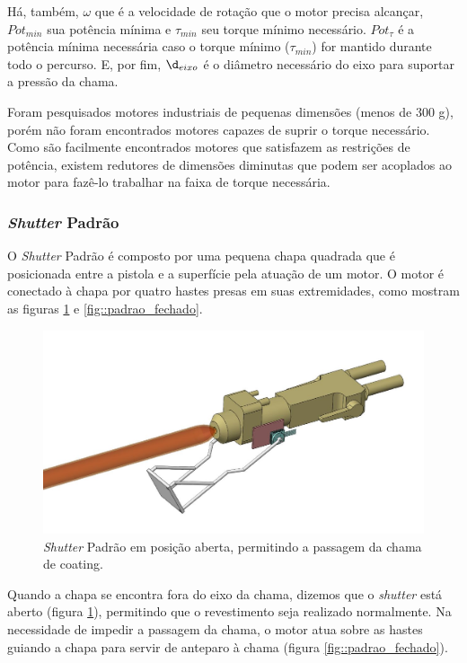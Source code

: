 Há, também, $\omega$ que é a velocidade de rotação que o motor precisa alcançar,
$Pot_{min}$ sua potência mínima e $\tau_{min}$ seu torque mínimo necessário.
$Pot_{\tau}$ é a potência mínima necessária caso o torque mínimo ($\tau_{min}$)
for mantido durante todo o percurso. E, por fim, $\d_{eixo}$ é o diâmetro necessário do eixo para suportar a
pressão da chama.

Foram pesquisados motores industriais de pequenas dimensões (menos de 300 g),
porém não foram encontrados motores capazes de suprir o torque necessário. Como
são facilmente encontrados motores que satisfazem as restrições de potência,
existem redutores de dimensões diminutas que podem ser acoplados ao motor para
fazê-lo trabalhar na faixa de torque necessária.


\subsubsection{\textit{Shutter} Padrão}

O \textit{Shutter} Padrão é composto por uma pequena chapa quadrada que é
posicionada entre a pistola e a superfície pela atuação de um motor. O motor é
conectado à chapa por quatro hastes presas em suas extremidades, como mostram as
figuras \ref{fig::padrao_aberto} e \ref{fig::padrao_fechado}.

\begin{figure}[h!]
\centering
	\includegraphics[width=\columnwidth]{figs/estudo/shutter/Padrao_aberto}
	\caption{\textit{Shutter} Padrão em posição aberta, permitindo a passagem da chama
	de coating.}
	\label{fig::padrao_aberto}
\end{figure}

Quando a chapa se encontra fora do eixo da chama, dizemos que
o \textit{shutter} está aberto (figura \ref{fig::padrao_aberto}), permitindo que
o revestimento seja realizado normalmente. Na necessidade de impedir a
passagem da chama, o motor atua sobre as hastes guiando a chapa para servir de
anteparo à chama (figura \ref{fig::padrao_fechado}).

